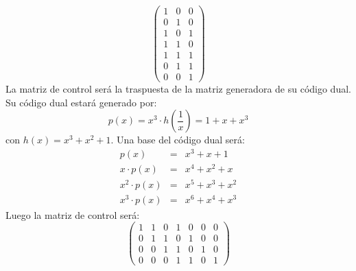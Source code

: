\begin{itemize}
\begin{displaymath}
\left( \begin{array}{ccc}
1&0&0\\
0&1&0\\
1&0&1\\
1&1&0\\
1&1&1\\
0&1&1\\
0&0&1
\end{array} \right)
\end{displaymath}
La matriz de control ser\'a la traspuesta de la matriz generadora de su 
c\'odigo dual. Su c\'odigo dual estar\'a generado por:
\begin{displaymath}
p(x) = x^3\cdot h(\frac{1}{x}) = 1+x+x^3
\end{displaymath}
con $h(x)=x^3+x^2+1$. Una base del c\'odigo dual ser\'a:
\begin{eqnarray*}
p(x)&=&x^3+x+1\\
x\cdot p(x)&=&x^4+x^2+x\\
x^2\cdot p(x)&=&x^5+x^3+x^2\\
x^3\cdot p(x)&=&x^6+x^4+x^3
\end{eqnarray*}
Luego la matriz de control ser\'a:
\begin{displaymath}
\left( \begin{array}{ccccccc}
1&1&0&1&0&0&0\\
0&1&1&0&1&0&0\\
0&0&1&1&0&1&0\\
0&0&0&1&1&0&1
\end{array} \right)
\end{displaymath}


\end{itemize}
